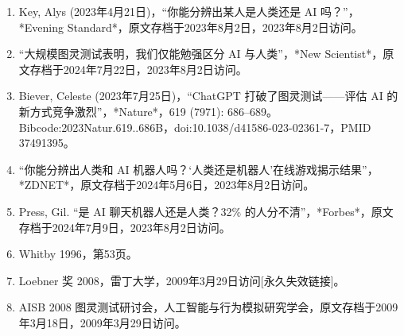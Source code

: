 \begin{enumerate}
\item Key, Alys (2023年4月21日)，“你能分辨出某人是人类还是 AI 吗？”，*Evening Standard*，原文存档于2023年8月2日，2023年8月2日访问。
\item “大规模图灵测试表明，我们仅能勉强区分 AI 与人类”，*New Scientist*，原文存档于2024年7月22日，2023年8月2日访问。
\item Biever, Celeste (2023年7月25日)，“ChatGPT 打破了图灵测试——评估 AI 的新方式竞争激烈”，*Nature*，619 (7971): 686–689。Bibcode:2023Natur.619..686B，doi:10.1038/d41586-023-02361-7，PMID 37491395。
\item “你能分辨出人类和 AI 机器人吗？‘人类还是机器人’在线游戏揭示结果”，*ZDNET*，原文存档于2024年5月6日，2023年8月2日访问。
\item Press, Gil. “是 AI 聊天机器人还是人类？32\% 的人分不清”，*Forbes*，原文存档于2024年7月9日，2023年8月2日访问。
\item Whitby 1996，第53页。
\item Loebner 奖 2008，雷丁大学，2009年3月29日访问[永久失效链接]。
\item AISB 2008 图灵测试研讨会，人工智能与行为模拟研究学会，原文存档于2009年3月18日，2009年3月29日访问。
\end{enumerate}
